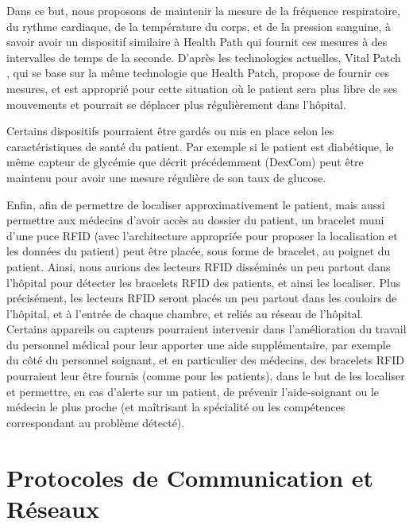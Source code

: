 \documentclass{article}
\begin{document}
Dans ce but, nous proposons de maintenir la mesure de la fréquence respiratoire, du rythme cardiaque, de la température du corps, et de la pression sanguine, à savoir avoir un dispositif similaire à Health Path qui fournit ces mesures à des intervalles de temps de la seconde. D’après les technologies actuelles, Vital Patch \cite{VitalPatch}, qui se base sur la même technologie que Health Patch, propose de fournir ces mesures, et est approprié pour cette situation où le patient sera plus libre de ses mouvements et pourrait se déplacer plus régulièrement dans l’hôpital.

Certains dispositifs pourraient être gardés ou mis en place selon les caractéristiques de santé du patient. Par exemple si le patient est diabétique, le même capteur de glycémie que décrit précédemment (DexCom) peut être maintenu pour avoir une mesure régulière de son taux de glucose.

Enfin, afin de permettre de localiser approximativement le patient, mais aussi permettre aux médecins d’avoir accès au dossier du patient, un bracelet muni d’une puce RFID (avec l’architecture appropriée pour proposer la localisation et les données du patient) peut être placée, sous forme de bracelet, au poignet du patient. Ainsi, nous aurions des lecteurs RFID disséminés un peu partout dans l’hôpital pour détecter les bracelets RFID des patients, et ainsi les localiser. Plus précisément, les lecteurs RFID seront placés un peu partout dans les couloirs de l’hôpital, et à l’entrée de chaque chambre, et reliés au réseau de l'hôpital.
\\

Certains appareils ou capteurs pourraient intervenir dans l'amélioration du travail du personnel médical pour leur apporter une aide supplémentaire, par exemple du côté du personnel soignant, et en particulier des médecins, des bracelets RFID \cite{BraceletRFID} pourraient leur être fournis (comme pour les patients), dans le but de les localiser et permettre, en cas d’alerte sur un patient, de prévenir l’aide-soignant ou le médecin le plus proche (et maîtrisant la spécialité ou les compétences correspondant au problème détecté).

\section {Protocoles de Communication et Réseaux}
\end{document}
